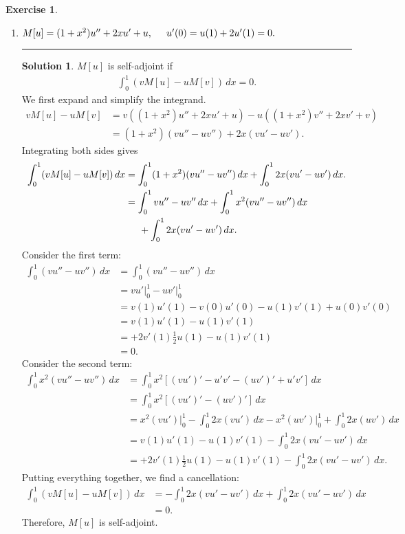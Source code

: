 \documentclass{book}
\theoremstyle{definition}
\newtheorem*{exer*}{Exercise}
\newtheorem*{sln*}{Solution}
\begin{document}
\begin{exer*}
\begin{enumerate}
		
		\item $M[u] = (1+x^2)u'' + 2xu' + u,\hspace{0.5cm} u'(0) = u(1) + 2u'(1) = 0.$\\
		\noindent\rule{\textwidth}{0.5pt}
		\begin{sln*}
			$M[u]$ is self-adjoint if
			\begin{align*}
			\int^1_0 (vM[u] - uM[v])\,dx = 0.
			\end{align*}
			We first expand and simplify the integrand.
			\begin{align*}
			vM[u] - uM[v] &= v((1+x^2)u'' + 2xu' + u) - u((1+x^2)v'' + 2xv' + v)\\
			&= (1+x^2)(vu'' - uv'') + 2x(vu' - uv').
			\end{align*} 
			Integrating both sides gives
			\begin{align*}
			\int^1_0 (vM[u] - uM[v])\,dx &= \int^1_0 (1+x^2)(vu'' - uv'')\,dx + \int^1_0 2x(vu' - uv')\,dx.\\
			&=\int^1_0 vu'' - uv''\,dx + \int^1_0 x^2(vu'' - uv'')\,dx\\
			&\hspace{0.5cm} + \int^1_0 2x(vu' - uv')\,dx.
			\end{align*}
			Consider the first term:
			\begin{align*}
			\int^1_0 (vu'' - uv'')\,dx &= \int^1_0 (vu'' - uv'')\,dx\\
			&= vu'\bigg\vert^1_0 - uv'\bigg\vert^1_0\\
			&= v(1)u'(1) - v(0)u'(0) - u(1)v'(1) + u(0)v'(0)\\
			&= v(1)u'(1) - u(1)v'(1)\\
			&= +2v'(1)\frac{1}{2}u(1) - u(1)v'(1)\\
			&= 0.
			\end{align*}
			Consider the second term:
			\begin{align*}
			\int^1_0 x^2(vu'' - uv'')\,dx &= \int^1_0 x^2 \left[ (vu')' - u'v' - (uv')' + u'v'  \right]\,dx\\
			&= \int^1_0 x^2\left[ (vu')' - (uv')' \right]\,dx\\
			&= x^2(vu')\bigg\vert^1_0 - \int^1_0 2x(vu')\,dx - x^2(uv')\bigg\vert^1_0 + \int^1_0 2x(uv')\,dx\\
			&= v(1)u'(1) - u(1)v'(1) - \int^1_0 2x(vu' - uv')\,dx\\
			&= +2v'(1)\frac{1}{2}u(1) - u(1)v'(1) - \int^1_0 2x(vu' - uv')\,dx.
			\end{align*} 
			Putting everything together, we find a cancellation:
			\begin{align*}
			\int^1_0 (vM[u] - uM[v])\,dx &= - \int^1_0 2x(vu' - uv')\,dx + \int^1_0 2x(vu' - uv')\,dx\\
			&= 0.
			\end{align*} 
			Therefore, $M[u]$ is self-adjoint. 
			

\end{sln*}
\end{enumerate}
\end{exer*}
\end{document}
